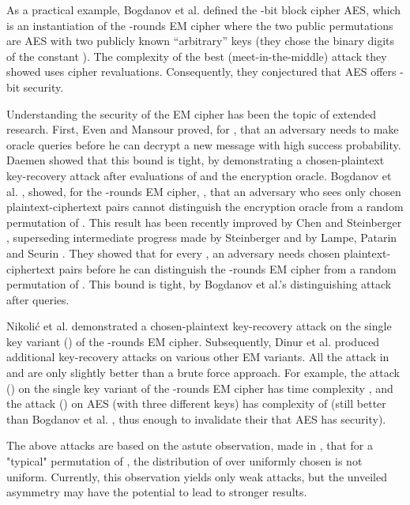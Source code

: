 \documentclass{llncs}
\begin{document}
As a practical example, Bogdanov et al. defined the -bit block cipher AES, which is an instantiation of the -rounds EM cipher where the two public permutations are AES with two publicly known ``arbitrary'' keys (they chose the binary digits of the constant ). The complexity of the best (meet-in-the-middle) attack they showed uses  cipher revaluations. Consequently, they conjectured that AES offers -bit security.

Understanding the security of the EM cipher has been the topic of extended research. 
First, Even and Mansour \cite{EM} proved, for , that an adversary needs to make  oracle queries before he can decrypt a new message with high success probability. 
Daemen \cite{Daemen} showed that this bound is tight, by demonstrating a chosen-plaintext key-recovery attack after  evaluations of  and the encryption oracle.
Bogdanov et al. \cite{BKLSST}, showed, for the -rounds EM cipher, , that an adversary who sees only  chosen plaintext-ciphertext pairs cannot distinguish the encryption oracle from a random permutation of .
This result has been recently improved by Chen and Steinberger \cite{CS}, superseding intermediate progress made by Steinberger \cite{Steinberger} and by Lampe, Patarin and Seurin \cite{LPS}. They showed that for every , an adversary needs  chosen plaintext-ciphertext pairs before he can distinguish the -rounds EM cipher from a random permutation of . This bound is tight, by Bogdanov et al.'s \cite{BKLSST} distinguishing attack after  queries.

Nikoli{\'c} et al. \cite{NWW} demonstrated a chosen-plaintext key-recovery attack on the single key variant () of the -rounds EM cipher. Subsequently, Dinur et al. \cite{DDKS} produced additional key-recovery attacks on various other EM variants. 
All the attack in \cite{NWW} and \cite{DDKS} are only slightly better than a brute force approach. For example, the attack (\cite{DDKS}) on the single key variant of the -rounds EM cipher has time complexity , and the attack (\cite{DDKS}) on AES (with three different keys) has complexity of  
(still better than Bogdanov et al. \cite{BKLSST}, thus enough to invalidate their that AES has  security). 

The above attacks are based on the astute observation, made in \cite{NWW}, that for a "typical" permutation  of , the distribution of  over uniformly chosen  is not uniform. Currently, this observation yields only weak attacks, but the unveiled asymmetry may have the potential to lead to stronger results. 
\end{document}
